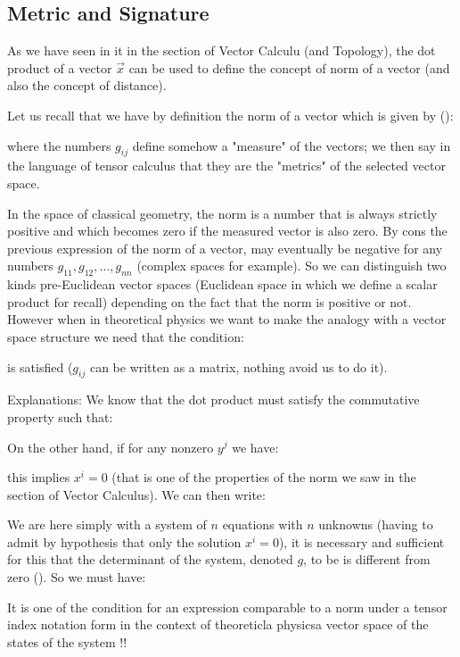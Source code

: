 	\subsection{Metric and Signature}
	As we have seen in it in the section of Vector Calculu (and Topology), the dot product of a vector $\vec{x}$ can be used to define the concept of norm of a vector (and also the concept of distance).
	
	Let us recall that we have by definition the norm of a vector which is given by ():
	
	where the numbers $g_{ij}$ define somehow a "measure" of the vectors; we then say in the language of tensor calculus that they are the "metrics" of the selected vector space.
	
	In the space of classical geometry, the norm is a number that is always strictly positive and which becomes zero if the measured vector is also zero. By cons the previous expression of the norm of a vector, may eventually be negative for any numbers $g_{11},g_{12},\ldots,g_{nn}$ (complex spaces for example). So we can distinguish two kinds pre-Euclidean vector spaces (Euclidean space in which we define a scalar product for recall) depending on the fact that the norm is positive or not. However when in theoretical physics we want to make the analogy with a vector space structure we need that the condition:
	
	is satisfied ($g_{ij}$ can be written as a matrix, nothing avoid us to do it).
	
	Explanations: We know that the dot product must satisfy the commutative property such that:
	
	On the other hand, if for any nonzero $y^j$ we have:
	
	this implies $x^i=0$ (that is one of the properties of the norm we saw in the section of Vector Calculus). We can then write:
	
	We are here simply with a system of $n$ equations with $n$ unknowns (having to admit by hypothesis that only the solution $x^i=0$), it is necessary and sufficient for this that the determinant of the system, denoted $g$, to be is different from zero (). So we must have:
	
	It is one of the condition for an expression comparable to a norm under a tensor index notation form in the context of theoreticla physicsa vector space of the states of the system !!
	
